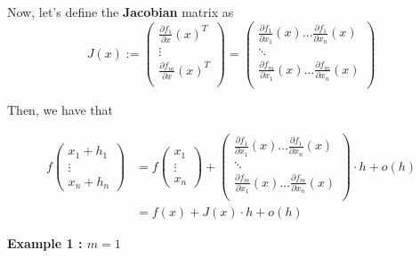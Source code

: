 \documentclass{tufte-handout}
\begin{document}
Now, let's define the \textbf{Jacobian} matrix as 
$$ J(x) := \begin{pmatrix}
\frac{\partial f_1}{\partial x}(x)^T\\
\vdots\\
\frac{\partial f_m}{\partial x}(x)^T\\
\end{pmatrix} = 
\begin{pmatrix}
\frac{\partial f_1}{\partial x_1}(x) \ldots \frac{\partial f_1}{\partial x_n}(x)\\
\ddots \\
\frac{\partial f_m}{\partial x_1}(x) \ldots \frac{\partial f_m}{\partial x_n}(x)\\
\end{pmatrix}
$$ 


Then, we have that 

\begin{align*}
f \begin{pmatrix}
x_1 + h_1\\
\vdots\\
x_n + h_n
\end{pmatrix} &= f
\begin{pmatrix}
x_1\\
\vdots\\
x_n
\end{pmatrix} + 
\begin{pmatrix}
\frac{\partial f_1}{\partial x_1}(x) \ldots \frac{\partial f_1}{\partial x_n}(x)\\
\ddots \\
\frac{\partial f_m}{\partial x_1}(x) \ldots \frac{\partial f_m}{\partial x_n}(x)\\
\end{pmatrix} \cdot
h + o(h)\\
&= f(x) + J(x)\cdot h + o(h)
\end{align*}

\textbf{Example 1 : $ m = 1 $}
\label{example:jac1}
\end{document}
